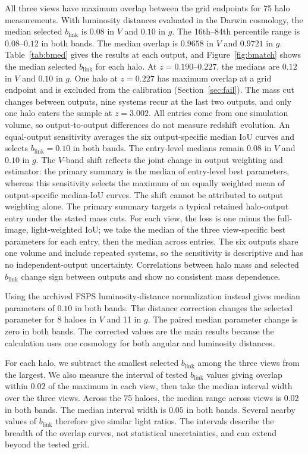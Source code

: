 \documentclass[usenatbib]{mnras}
\begin{document}
All three views have maximum overlap between the grid endpoints for
75 halo measurements. With luminosity distances evaluated in the Darwin
cosmology, the median selected $b_{\mathrm{link}}$ is $0.08$ in $V$ and $0.10$ in $g$. The 16th--84th percentile range is $0.08$--$0.12$ in both bands. The
median overlap is $0.9658$ in $V$ and $0.9721$ in $g$.
Table~\ref{tab:bmed} gives the results at each output, and
Figure~\ref{fig:bmatch} shows the median selected $b_{\mathrm{link}}$ for each halo.
At $z=0.190$--$0.227$, the medians are $0.12$ in $V$ and $0.10$ in $g$.
One halo at $z=0.227$ has maximum overlap at a grid endpoint and is
excluded from the calibration (Section~\ref{sec:fail}).
The mass cut changes between outputs, nine systems recur at the last
two outputs, and only one halo enters the sample at $z=3.002$. All entries
come from one simulation volume, so output-to-output differences do not
measure redshift evolution.
An equal-output sensitivity averages the six output-specific median IoU
curves and selects $b_{\mathrm{link}}=0.10$ in both bands. The entry-level
medians remain $0.08$ in $V$ and $0.10$ in $g$. The $V$-band shift reflects
the joint change in output weighting and estimator: the primary summary is
the median of entry-level best parameters, whereas this sensitivity selects
the maximum of an equally weighted mean of output-specific median-IoU
curves. The shift cannot be attributed to output weighting alone. The
primary summary targets a typical retained halo-output entry under the
stated mass cuts. For each view, the loss is one minus the full-image,
light-weighted IoU; we take the median of the three view-specific best
parameters for each entry, then the median across entries. The six outputs
share one volume and include repeated systems, so the sensitivity is
descriptive and has no independent-output uncertainty.
Correlations between halo mass and selected $b_{\mathrm{link}}$ change sign between
outputs and show no consistent mass dependence.

Using the archived FSPS luminosity-distance normalization instead gives
median parameters of $0.10$ in both bands. The distance correction
changes the selected parameter for 8 haloes in $V$ and 11 in $g$. The
paired median parameter change is zero in both bands. The corrected
values are the main results because the calculation uses one cosmology for both
angular and luminosity distances.

For each halo, we subtract the smallest selected $b_{\mathrm{link}}$ among the three
views from the largest. We also measure the interval of tested $b_{\mathrm{link}}$
values giving overlap within $0.02$ of the maximum in each view, then
take the median interval width over the three views.
Across the 75 haloes, the median range across views is $0.02$ in both
bands. The median interval width is $0.05$ in both bands.
Several nearby values of $b_{\mathrm{link}}$ therefore give similar light ratios.
The intervals describe the breadth of the overlap curves, not
statistical uncertainties, and can extend beyond the tested grid.
\end{document}
